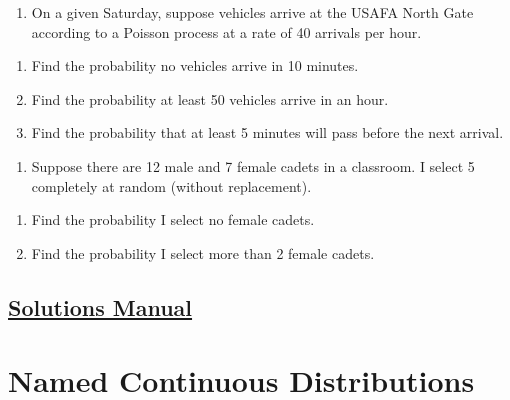 \documentclass[
  letterpaper,
  DIV=11,
  numbers=noendperiod]{scrreprt}
\providecommand{\tightlist}{%
  \setlength{\itemsep}{0pt}\setlength{\parskip}{0pt}}\usepackage{longtable,booktabs,array}
\begin{document}
\begin{enumerate}
\def\labelenumi{\arabic{enumi}.}
\setcounter{enumi}{1}
\tightlist
\item
  On a given Saturday, suppose vehicles arrive at the USAFA North Gate
  according to a Poisson process at a rate of 40 arrivals per hour.
\end{enumerate}

\begin{enumerate}
\def\labelenumi{\alph{enumi}.}
\tightlist
\item
  Find the probability no vehicles arrive in 10 minutes.\\
\item
  Find the probability at least 50 vehicles arrive in an hour.\\
\item
  Find the probability that at least 5 minutes will pass before the next
  arrival.
\end{enumerate}

\begin{enumerate}
\def\labelenumi{\arabic{enumi}.}
\setcounter{enumi}{2}
\tightlist
\item
  Suppose there are 12 male and 7 female cadets in a classroom. I select
  5 completely at random (without replacement).
\end{enumerate}

\begin{enumerate}
\def\labelenumi{\alph{enumi}.}
\tightlist
\item
  Find the probability I select no female cadets.\\
\item
  Find the probability I select more than 2 female cadets.
\end{enumerate}

\section*{\texorpdfstring{\href{https://ds-usafa.github.io/CPS-Solutions-Manual/DISCRETENAMED.html}{Solutions
Manual}}{Solutions Manual}}\label{solutions-manual-12}


\chapter{Named Continuous Distributions}\label{CONTNNAMED}
\end{document}

